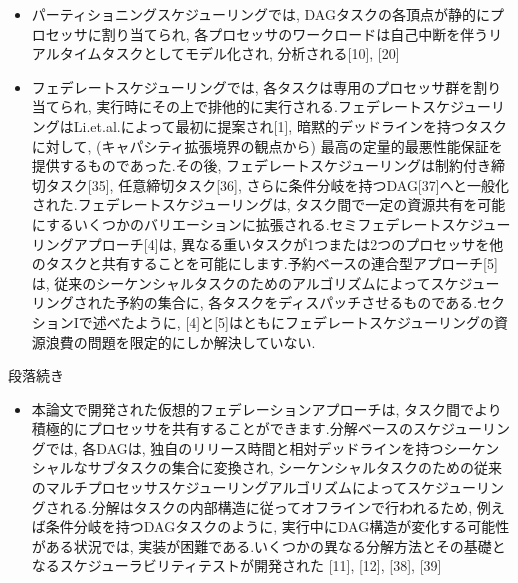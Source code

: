 {    \begin{frame}{}
        \begin{itemize}
            \item パーティショニングスケジューリングでは, DAGタスクの各頂点が静的にプロセッサに割り当てられ, 各プロセッサのワークロードは自己中断を伴うリアルタイムタスクとしてモデル化され, 分析される[10], [20]
            \item フェデレートスケジューリングでは, 各タスクは専用のプロセッサ群を割り当てられ, 実行時にその上で排他的に実行される.フェデレートスケジューリングはLi.et.al.によって最初に提案され[1], 暗黙的デッドラインを持つタスクに対して,  (キャパシティ拡張境界の観点から) 最高の定量的最悪性能保証を提供するものであった.その後, フェデレートスケジューリングは制約付き締切タスク[35], 任意締切タスク[36], さらに条件分岐を持つDAG[37]へと一般化された.フェデレートスケジューリングは, タスク間で一定の資源共有を可能にするいくつかのバリエーションに拡張される.セミフェデレートスケジューリングアプローチ[4]は, 異なる重いタスクが1つまたは2つのプロセッサを他のタスクと共有することを可能にします.予約ベースの連合型アプローチ[5]は, 従来のシーケンシャルタスクのためのアルゴリズムによってスケジューリングされた予約の集合に, 各タスクをディスパッチさせるものである.セクションIで述べたように, [4]と[5]はともにフェデレートスケジューリングの資源浪費の問題を限定的にしか解決していない.
        \end{itemize}
    \end{frame}

    \begin{frame}{段落続き}
        \begin{itemize}
            \item 本論文で開発された仮想的フェデレーションアプローチは, タスク間でより積極的にプロセッサを共有することができます.分解ベースのスケジューリングでは, 各DAGは, 独自のリリース時間と相対デッドラインを持つシーケンシャルなサブタスクの集合に変換され, シーケンシャルタスクのための従来のマルチプロセッサスケジューリングアルゴリズムによってスケジューリングされる.分解はタスクの内部構造に従ってオフラインで行われるため, 例えば条件分岐を持つDAGタスクのように, 実行中にDAG構造が変化する可能性がある状況では, 実装が困難である.いくつかの異なる分解方法とその基礎となるスケジューラビリティテストが開発された [11], [12], [38], [39]
        \end{itemize}
    \end{frame}
}
